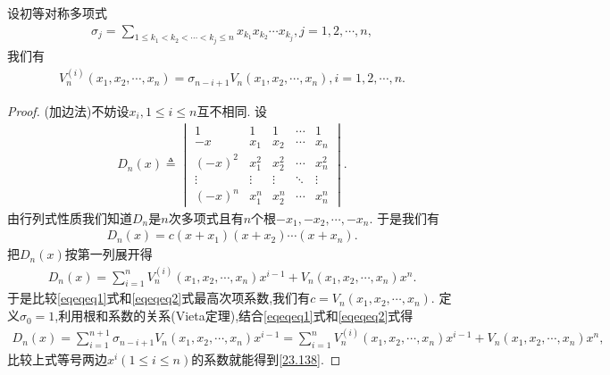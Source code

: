 \documentclass[../../main.tex]{subfiles}%
\begin{document}
\begin{example}
设初等对称多项式
\begin{align}\label{23.137}
\sigma_j=\sum_{1\leqslant k_1<k_2<\cdots<k_j\leqslant n}x_{k_1}x_{k_2}\cdots x_{k_j},j = 1,2,\cdots,n,
\end{align}
我们有
\begin{align}
V_n^{(i)}(x_1,x_2,\cdots,x_n)=\sigma_{n - i + 1}V_n(x_1,x_2,\cdots,x_n),i = 1,2,\cdots,n.\label{23.138}
\end{align}
\end{example}
\begin{proof}

(加边法)不妨设\(x_i,1\leqslant i\leqslant n\)互不相同. 设
\begin{align*}
D_n(x)\triangleq\begin{vmatrix}
1&1&1&\cdots&1\\
-x&x_1&x_2&\cdots&x_n\\
(-x)^2&x_1^2&x_2^2&\cdots&x_n^2\\
\vdots&\vdots&\vdots&\ddots&\vdots\\
(-x)^n&x_1^n&x_2^n&\cdots&x_n^n
\end{vmatrix}.
\end{align*}
由行列式性质我们知道\(D_n\)是\(n\)次多项式且有\(n\)个根\(-x_1,-x_2,\cdots,-x_n\). 于是我们有
\begin{align}\label{eqeqeq1}
D_n(x)=c(x + x_1)(x + x_2)\cdots(x + x_n).
\end{align}
把\(D_n(x)\)按第一列展开得
\begin{align}\label{eqeqeq2}
D_n(x)=\sum_{i = 1}^{n}V_n^{(i)}(x_1,x_2,\cdots,x_n)x^{i - 1}+V_n(x_1,x_2,\cdots,x_n)x^n.
\end{align}
于是比较\eqref{eqeqeq1}式和\eqref{eqeqeq2}式最高次项系数,我们有\(c = V_n(x_1,x_2,\cdots,x_n)\). 定义\(\sigma_0 = 1\),利用根和系数的关系(Vieta定理),结合\eqref{eqeqeq1}式和\eqref{eqeqeq2}式得
\begin{align*}
D_n(x)=\sum_{i = 1}^{n + 1}\sigma_{n - i + 1}V_n(x_1,x_2,\cdots,x_n)x^{i - 1}=\sum_{i = 1}^{n}V_n^{(i)}(x_1,x_2,\cdots,x_n)x^{i - 1}+V_n(x_1,x_2,\cdots,x_n)x^n,
\end{align*}
比较上式等号两边$x^i(1\leqslant  i\leqslant  n)$的系数就能得到\eqref{23.138}. 

\end{proof}
\end{document}
